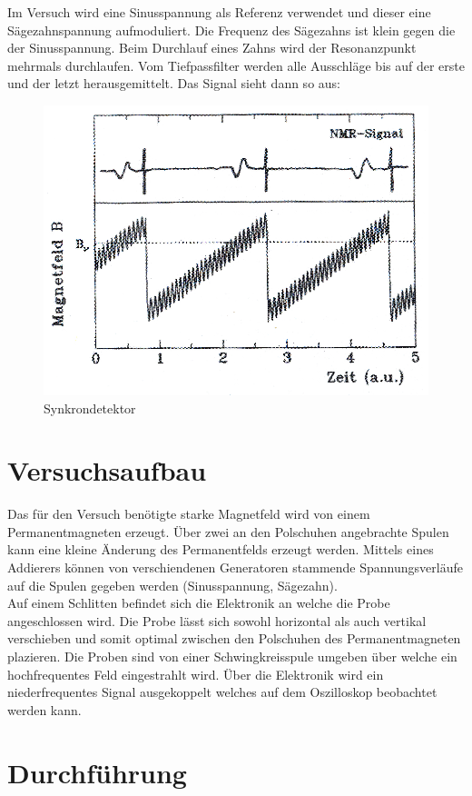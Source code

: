 \documentclass[12pt]{article}
\begin{document}
Im Versuch wird eine Sinusspannung als Referenz verwendet und dieser eine Sägezahnspannung aufmoduliert. Die Frequenz des Sägezahns ist klein gegen die der Sinusspannung. Beim Durchlauf eines Zahns wird der Resonanzpunkt mehrmals durchlaufen. Vom Tiefpassfilter werden alle Ausschläge bis auf der erste und der letzt herausgemittelt. Das Signal sieht dann so aus:
\begin{figure}[H]
\centering
\includegraphics[width=0.9\linewidth]{pictures/schemalockin.eps}
\caption{Synkrondetektor}
\end{figure}

\section{Versuchsaufbau}
Das für den Versuch benötigte starke Magnetfeld wird von einem Permanentmagneten erzeugt. Über zwei an den Polschuhen angebrachte Spulen kann eine kleine Änderung des Permanentfelds erzeugt werden. Mittels eines Addierers können von verschiendenen Generatoren stammende Spannungsverläufe auf die Spulen gegeben werden (Sinusspannung, Sägezahn).\\

Auf einem Schlitten befindet sich die Elektronik an welche die Probe angeschlossen wird. Die Probe lässt sich sowohl horizontal als auch vertikal verschieben und somit optimal zwischen den Polschuhen des Permanentmagneten plazieren.
Die Proben sind von einer Schwingkreisspule umgeben über welche ein hochfrequentes Feld eingestrahlt wird. Über die Elektronik wird ein niederfrequentes Signal ausgekoppelt welches auf dem Oszilloskop beobachtet werden kann.

\section{Durchführung}
\end{document}
